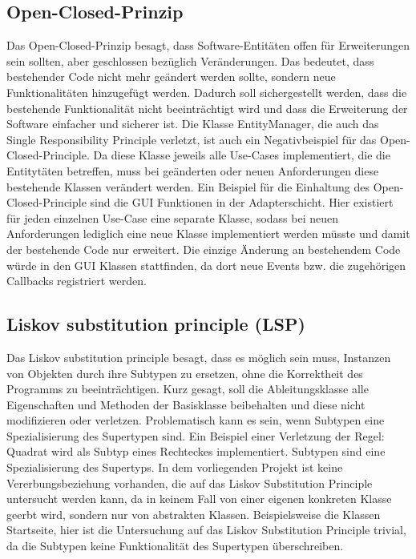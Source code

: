 \subsection{Open-Closed-Prinzip}
Das Open-Closed-Prinzip besagt, dass Software-Entitäten offen für Erweiterungen sein sollten, aber geschlossen bezüglich Veränderungen. Das bedeutet, dass bestehender Code nicht mehr geändert werden sollte, sondern neue Funktionalitäten hinzugefügt werden. Dadurch soll sichergestellt werden, dass die bestehende Funktionalität nicht beeinträchtigt wird und dass die Erweiterung der Software einfacher und sicherer ist. Die Klasse EntityManager, die auch das Single Responsibility Principle verletzt, ist auch ein Negativbeispiel für das Open-Closed-Principle. Da diese Klasse jeweils alle Use-Cases implementiert, die die Entitytäten betreffen, muss bei geänderten oder neuen Anforderungen diese bestehende Klassen verändert werden.
Ein Beispiel für die Einhaltung des Open-Closed-Principle sind die GUI Funktionen in der Adapterschicht.
Hier existiert für jeden einzelnen Use-Case eine separate Klasse, sodass bei neuen Anforderungen lediglich eine neue Klasse implementiert werden müsste und damit der bestehende Code nur erweitert. Die einzige Änderung an bestehendem Code würde in den GUI Klassen stattfinden, da dort neue Events bzw. die zugehörigen Callbacks registriert werden.

\subsection{Liskov substitution principle (LSP)}
Das Liskov substitution principle besagt, dass es möglich sein muss, Instanzen von Objekten durch ihre Subtypen zu ersetzen, ohne die Korrektheit des Programms zu beeinträchtigen. Kurz gesagt, soll die Ableitungsklasse alle Eigenschaften und Methoden der Basisklasse beibehalten und diese nicht modifizieren oder verletzen. Problematisch kann es sein, wenn Subtypen eine Spezialisierung des Supertypen sind. Ein Beispiel einer Verletzung der Regel: Quadrat wird als Subtyp eines Rechteckes implementiert. Subtypen sind eine Spezialisierung des Supertyps.
In dem vorliegenden Projekt ist keine Vererbungsbeziehung vorhanden, die auf das Liskov Substitution Principle untersucht werden kann, da in keinem Fall von einer eigenen konkreten Klasse geerbt wird, sondern nur von abstrakten Klassen. Beispielsweise die Klassen Startseite, hier ist die Untersuchung auf das Liskov Substitution Principle trivial, da die Subtypen keine Funktionalität des Supertypen überschreiben.


